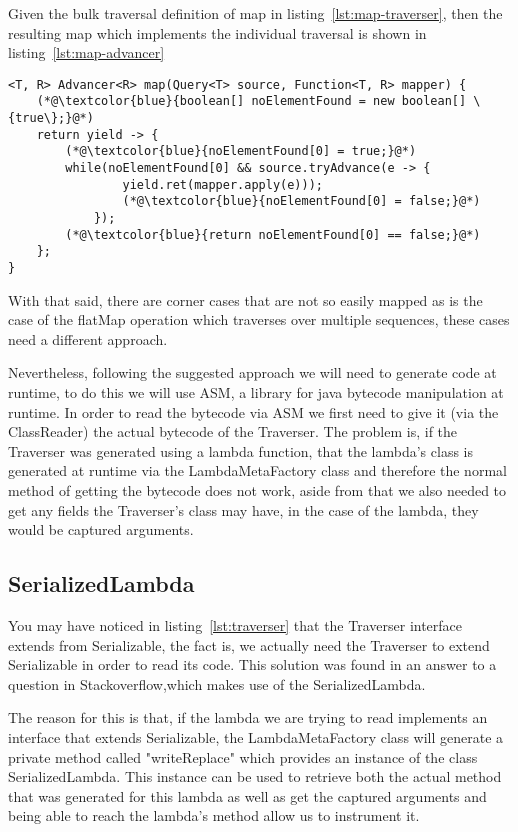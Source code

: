 Given the bulk traversal definition of map in listing~\ref{lst:map-traverser}, then the resulting map which implements the individual traversal is shown in listing~\ref{lst:map-advancer}

\begin{lstlisting}[caption={Map Advancer},label={lst:map-advancer},captionpos=b]
<T, R> Advancer<R> map(Query<T> source, Function<T, R> mapper) {
	(*@\textcolor{blue}{boolean[] noElementFound = new boolean[] \{true\};}@*)
	return yield -> {
		(*@\textcolor{blue}{noElementFound[0] = true;}@*)
		while(noElementFound[0] && source.tryAdvance(e -> {
				yield.ret(mapper.apply(e)));
				(*@\textcolor{blue}{noElementFound[0] = false;}@*)
			});
		(*@\textcolor{blue}{return noElementFound[0] == false;}@*)
	};
}
\end{lstlisting}

With that said, there are corner cases that are not so easily mapped as is the case of the flatMap operation which traverses over multiple sequences, these cases need a different approach.

Nevertheless, following the suggested approach we will need to generate code at runtime, to do this we will use ASM, a library for java bytecode manipulation at runtime. In order to read the bytecode via ASM we first need to give it (via the ClassReader) the actual bytecode of the Traverser. The problem is, if the Traverser was generated using a lambda function, that the lambda's class is generated at runtime via the LambdaMetaFactory class and therefore the normal method of getting the bytecode does not work, aside from that we also needed to get any fields the Traverser's class may have, in the case of the lambda, they would be captured arguments.

\subsection{SerializedLambda}

You may have noticed in listing~\ref{lst:traverser} that the Traverser interface extends from Serializable, the fact is, we actually need the Traverser to extend Serializable in order to read its code. This solution was found in an answer to a question in Stackoverflow\citep{stackoverflowlambdacode},which makes use of the SerializedLambda\citep{serializedlambda}.

The reason for this is that, if the lambda we are trying to read implements an interface that extends Serializable, the LambdaMetaFactory class will generate a private method called "writeReplace" which provides an instance of the class SerializedLambda. This instance can be used to retrieve both the actual method that was generated for this lambda as well as get the captured arguments and being able to reach the lambda's method allow us to instrument it.

